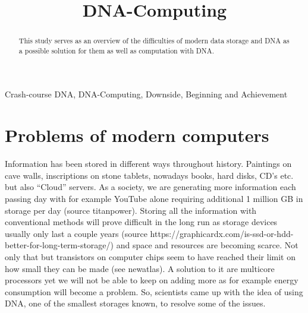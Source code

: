 \documentclass[conference]{IEEEtran}
\begin{document}
\title{DNA-Computing}

\author{
\and
{}
}

\maketitle

\begin{abstract}
This study serves as an overview of the difficulties of modern data storage and DNA as a possible solution for them as well as computation with DNA. 
\end{abstract}

\begin{IEEEkeywords}
Crash-course DNA, DNA-Computing, Downside, Beginning and Achievement
\end{IEEEkeywords}

\section{Problems of modern computers}
Information has been stored in different ways throughout history. Paintings on cave walls, inscriptions on stone tablets, nowadays books, hard disks, CD’s etc. but also “Cloud” servers.
As a society, we are generating more information each passing day with for example YouTube alone requiring additional 1 million GB in storage per day (source titanpower). Storing all the information with conventional methods will prove difficult in the long run as storage devices usually only last a couple years (source https://graphicardx.com/is-ssd-or-hdd-better-for-long-term-storage/) and space and resources are becoming scarce.
Not only that but transistors on computer chips seem to have reached their limit on how small they can be made (see newatlas). A solution to it are multicore processors yet we will not be able to keep on adding more as for example energy consumption will become a problem. 
So, scientists came up with the idea of using DNA, one of the smallest storages known, to resolve some of the issues. 
\end{document}
